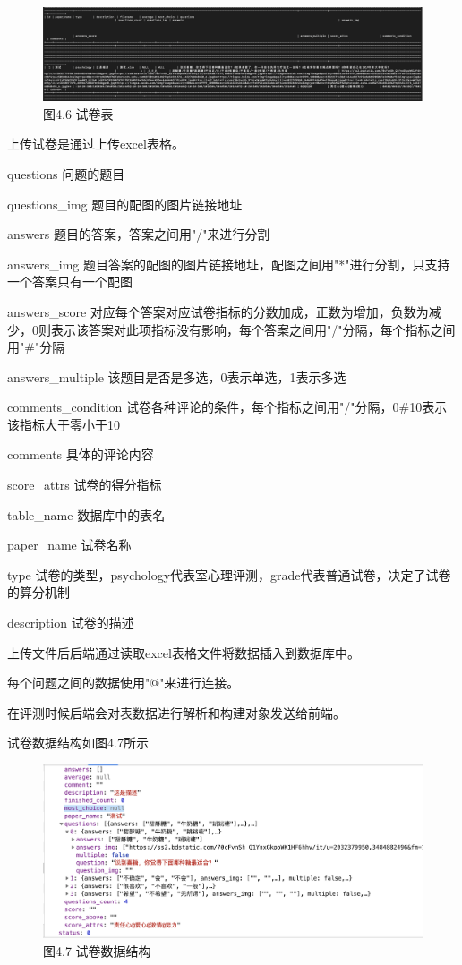 \begin{figure}[thbp!]
	\centering
	\includegraphics[width=1.0\linewidth]{figure/paper_database}
	\label{fig:paper_database} \\
		图4.6 试卷表
\end{figure}

上传试卷是通过上传excel表格。

questions 问题的题目

questions\_img 题目的配图的图片链接地址

answers 题目的答案，答案之间用"/"来进行分割

answers\_img 题目答案的配图的图片链接地址，配图之间用"*"进行分割，只支持一个答案只有一个配图

answers\_score 对应每个答案对应试卷指标的分数加成，正数为增加，负数为减少，0则表示该答案对此项指标没有影响，每个答案之间用"/"分隔，每个指标之间用"\#"分隔

answers\_multiple 该题目是否是多选，0表示单选，1表示多选

comments\_condition 试卷各种评论的条件，每个指标之间用"/"分隔，0\#10表示该指标大于零小于10

comments 具体的评论内容

score\_attrs 试卷的得分指标

table\_name 数据库中的表名

paper\_name 试卷名称

type 试卷的类型，psychology代表室心理评测，grade代表普通试卷，决定了试卷的算分机制

description 试卷的描述

上传文件后后端通过读取excel表格文件将数据插入到数据库中。

每个问题之间的数据使用"@"来进行连接。

在评测时候后端会对表数据进行解析和构建对象发送给前端。

试卷数据结构如图4.7所示

\begin{figure}[thbp!]
	\centering
	\includegraphics[width=1.0\linewidth]{figure/paper_data}
	\label{fig:paper_data} \\
		图4.7 试卷数据结构
\end{figure}

